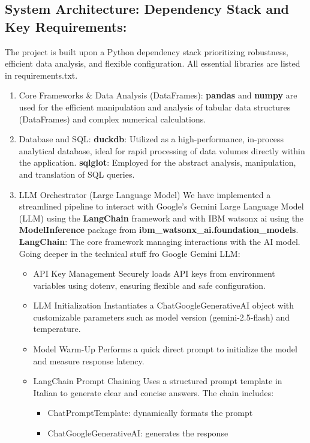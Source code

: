 \documentclass[12pt,a4paper]{article}
\begin{document}
\subsection{System Architecture: Dependency Stack and Key Requirements:}
The project is built upon a Python dependency stack prioritizing robustness, efficient data analysis, and flexible configuration. All essential libraries are listed in requirements.txt.
\begin{enumerate}
  \item Core Frameworks \& Data Analysis (DataFrames):
  \textbf{pandas} and \textbf{numpy} are used for the efficient manipulation and analysis of tabular data structures (DataFrames) and complex numerical calculations.
  \item Database and SQL:
  \textbf{duckdb}: Utilized as a high-performance, in-process analytical database, ideal for rapid processing of data volumes directly within the application.
  \textbf{sqlglot}: Employed for the abstract analysis, manipulation, and translation of SQL queries.
  \item LLM Orchestrator (Large Language Model)
  We have implemented a streamlined pipeline to interact with Google’s Gemini Large Language Model (LLM) using the \textbf{LangChain} framework and with IBM watsonx ai using the \textbf{ModelInference} package from  \textbf{ibm\_watsonx\_ai.foundation\_models}.
  \\\textbf{LangChain}: The core framework managing interactions with the AI model.
  \\Going deeper in the technical stuff fro Google Gemini LLM:
  \begin{itemize}
    \item  API Key Management Securely loads API keys from environment variables using dotenv, ensuring flexible and safe configuration.
    \item  LLM Initialization Instantiates a ChatGoogleGenerativeAI object with customizable parameters such as model version (gemini-2.5-flash) and temperature.
    \item  Model Warm-Up Performs a quick direct prompt to initialize the model and measure response latency.
    \item  LangChain Prompt Chaining Uses a structured prompt template in Italian to generate clear and concise answers. The chain includes:
        \begin{itemize}
          \item  ChatPromptTemplate: dynamically formats the prompt
          \item  ChatGoogleGenerativeAI: generates the response

\end{itemize}
\end{itemize}
\end{enumerate}
\end{document}
